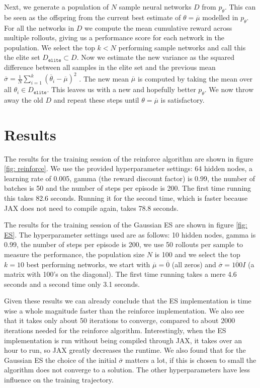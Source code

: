 \documentclass{article}
\begin{document}
Next, we generate a population of $N$ sample neural networks $D$ from
$p_\theta$. This can be seen as the offspring from the current best estimate of
$\theta = \overline\mu$ modelled in $p_\theta$. For all the networks in $D$ we
compute the mean cumulative reward across multiple rollouts, giving us a
performance score for each network in the population. We select the top $k < N$
performing sample networks and call this the elite set $D_\mathtt{elite}
\subset D$. Now we estimate the new variance as the squared difference between
all samples in the elite set and the previous mean $\overline\sigma =
\frac{1}{N} \sum^k_{i=1} \left( \overline\theta_i - \overline\mu \right)^2$ .
The new mean $\overline\mu$ is computed by taking the mean over all $\theta_i
\in D_\mathtt{elite}$. This leaves us with a new and hopefully better
$p_\theta$. We now throw away the old $D$ and repeat these steps until $\theta
= \overline\mu$ is satisfactory.

\section{Results}
\label{sec: results}
The results for the training session of the reinforce algorithm are shown in
figure \ref{fig: reinforce}. We use the provided hyperparameter settings: 64
hidden nodes, a learning rate of 0.005, gamma (the reward discount factor) is
0.99, the number of batches is 50 and the number of steps per episode is 200.
The first time running this takes 82.6 seconds. Running it for the second time,
which is faster because JAX does not need to compile again, takes 78.8 seconds.

The results for the training session of the Gaussian ES are shown in figure
\ref{fig: ES}. The hyperparameter settings used are as follows: 10 hidden
nodes, gamma is 0.99, the number of steps per episode is 200, we use 50
rollouts per sample to measure the performance, the population size $N$ is 100
and we select the top $k = 10$ best performing networks, we start with
$\overline\mu = \overline0$ (all zeros) and $\overline\sigma = \overline{100}
I$ (a matrix with 100's on the diagonal). The first time running takes a mere
4.6 seconds and a second time only 3.1 seconds.

Given these results we can already conclude that the ES implementation is
time wise a whole magnitude faster than the reinforce implementation. We also
see that it takes only about 50 iterations to converge, compared to about 2000
iterations needed for the reinforce algorithm. Interestingly, when the ES
implementation is run without being compiled through JAX, it takes over an hour
to run, so JAX greatly decreases the runtime. We also found that for the
Gaussian ES the choice of the initial $\overline\sigma$ matters a lot, if this
is chosen to small the algorithm does not converge to a solution. The other
hyperparameters have less influence on the training trajectory.
\end{document}
